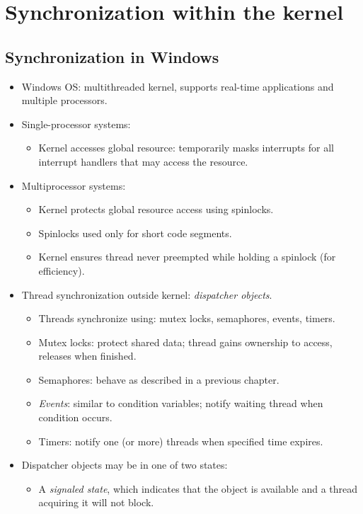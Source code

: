 \section{Synchronization within the kernel}

\subsection{Synchronization in Windows}
\begin{itemize}
    \item Windows OS: multithreaded kernel, supports real-time applications and multiple processors.
    \item Single-processor systems:
    \begin{itemize}
        \item Kernel accesses global resource: temporarily masks interrupts for all interrupt handlers that may access the resource.
    \end{itemize}
    \item Multiprocessor systems:
    \begin{itemize}
        \item Kernel protects global resource access using spinlocks.
        \item Spinlocks used only for short code segments.
        \item Kernel ensures thread never preempted while holding a spinlock (for efficiency).
    \end{itemize}
    \item Thread synchronization outside kernel: \textit{dispatcher objects}.
    \begin{itemize}
        \item Threads synchronize using: mutex locks, semaphores, events, timers.
        \item Mutex locks: protect shared data; thread gains ownership to access, releases when finished.
        \item Semaphores: behave as described in a previous chapter.
        \item \textit{Events}: similar to condition variables; notify waiting thread when condition occurs.
        \item Timers: notify one (or more) threads when specified time expires.
    \end{itemize}
    \item Dispatcher objects may be in one of two states:
    \begin{itemize}
        \item A \textit{signaled state}, which indicates that the object is available and a thread acquiring it will not block.

\end{itemize}
\end{itemize}
